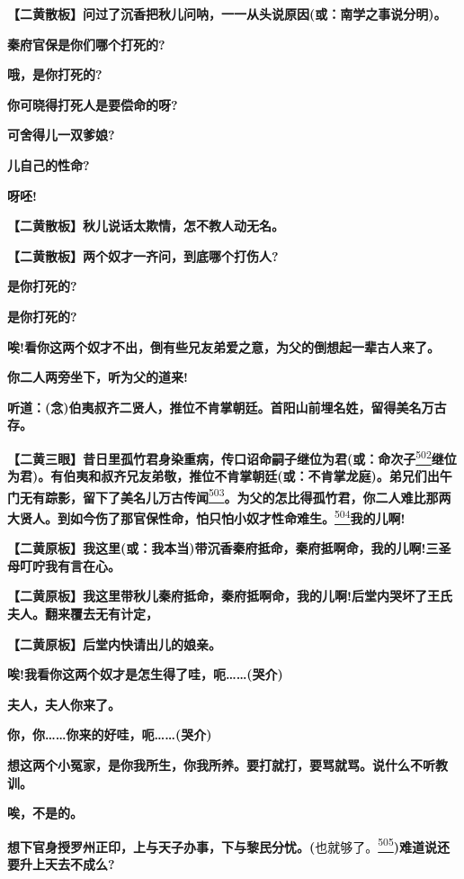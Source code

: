 \textbf{【二黄散板】问过了沉香把秋儿问呐，一一从头说原因(或：南学之事说分明)。}

\textbf{秦府官保是你们哪个打死的?}

\textbf{哦，是你打死的?}

\textbf{你可晓得打死人是要偿命的呀?}

\textbf{可舍得儿一双爹娘?}

\textbf{儿自己的性命?}

\textbf{呀呸!}

\textbf{【二黄散板】秋儿说话太欺情，怎不教人动无名。}

\textbf{【二黄散板】两个奴才一齐问，到底哪个打伤人?}

\textbf{是你打死的?}

\textbf{是你打死的?}

\textbf{唉!看你这两个奴才不出，倒有些兄友弟爱之意，为父的倒想起一辈古人来了。}

\textbf{你二人两旁坐下，听为父的道来!}

\textbf{听道：(念)伯夷叔齐二贤人，推位不肯掌朝廷。首阳山前埋名姓，留得美名万古存。}

\textbf{【二黄三眼】昔日里孤竹君身染重病，传口诏命嗣子继位为君(或：命次子}\protect\hyperlink{fn502}{\textsuperscript{502}}\textbf{继位为君)。有伯夷和叔齐兄友弟敬，推位不肯掌朝廷(或：不肯掌龙庭)。弟兄们出午门无有踪影，留下了美名儿万古传闻}\protect\hyperlink{fn503}{\textsuperscript{503}}\textbf{。为父的怎比得孤竹君，你二人难比那两大贤人。到如今伤了那官保性命，怕只怕小奴才性命难生。}\protect\hyperlink{fn504}{\textsuperscript{504}}\textbf{我的儿啊!}

\textbf{【二黄原板】我这里(或：我本当)带沉香秦府抵命，秦府抵啊命，我的儿啊!三圣母叮咛我有言在心。}

\textbf{【二黄原板】我这里带秋儿秦府抵命，秦府抵啊命，我的儿啊!后堂内哭坏了王氏夫人。翻来覆去无有计定，}

\textbf{【二黄原板】后堂内快请出儿的娘亲。}

\textbf{唉!我看你这两个奴才是怎生得了哇，呃\ldots{}\ldots{}(哭介)}

\textbf{夫人，夫人你来了。}

\textbf{你，你\ldots{}\ldots{}你来的好哇，呃\ldots{}\ldots{}(哭介)}

\textbf{想这两个小冤家，是你我所生，你我所养。要打就打，要骂就骂。说什么不听教训。}

\textbf{唉，不是的。}

\textbf{想下官身授罗州正印，上与天子办事，下与黎民分忧。(}也就够了。\protect\hyperlink{fn505}{\textsuperscript{505}}\textbf{)难道说还要升上天去不成么?}

